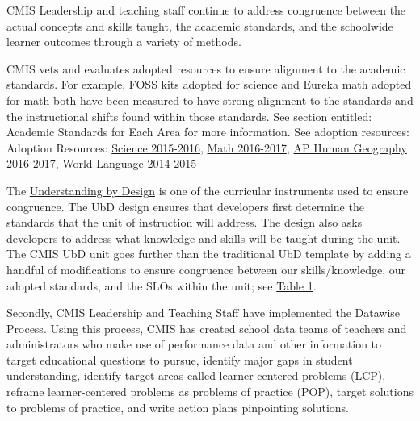\documentclass{report}
\begin{document}

\begin{findings}

CMIS Leadership and teaching staff continue to address congruence between the actual concepts and skills taught, the academic standards, and the schoolwide learner outcomes through a variety of methods. 


CMIS vets and evaluates adopted resources to ensure alignment to the academic standards. For example, FOSS kits adopted for science and Eureka math adopted for math both have been measured to have strong alignment to the standards and the instructional shifts found within those standards. See section entitled: Academic Standards for Each Area for more information. See adoption resources: Adoption Resources: \href{https://drive.google.com/drive/folders/0ByVFfrm0zfoleXEyU3I0cTBXMVk?usp=sharing}{Science 2015-2016}, \href{https://drive.google.com/drive/folders/0ByVFfrm0zfolakRsUVNBaXhWcjQ?usp=sharing}{Math 2016-2017}, \href{https://drive.google.com/drive/folders/0ByVFfrm0zfolLUN5UThPTG5wQlE?usp=sharing}{AP Human Geography 2016-2017}, \href{https://drive.google.com/drive/folders/0ByVFfrm0zfolfkhGeTFZSVRmSFNEZmhlaWZneEE5T0lwWjNQVnlFYVVWVlljU1RBTDZQc1k?usp=sharing}{World Language 2014-2015} 


The \href{https://docs.google.com/a/cmis.ac.th/document/d/1kL1VjwfuMMa7NaWmwUrEah1BM-jJRmLAd4VJzR3HoPs/edit?usp=sharing}{Understanding by Design} is one of the curricular instruments used to ensure congruence. The UbD design ensures that developers first determine the standards that the unit of instruction will address. The design also asks developers to address what knowledge and skills will be taught during the unit. The CMIS UbD unit goes further than the traditional UbD template by adding a handful of modifications to ensure congruence between our skills/knowledge, our adopted standards, and the SLOs within the unit; see \href{https://docs.google.com/a/cmis.ac.th/document/d/1wwb5O3EmHNmzx7MOdHvi0TFjyYRWyELnyD1VRsmuj1Y/edit?usp=sharing}{Table 1}.  


Secondly, CMIS Leadership and Teaching Staff have implemented the Datawise Process. Using this process, CMIS has created school data teams of teachers and administrators who make use of performance data and other information to target educational questions to pursue, identify major gaps in student understanding, identify target areas called learner-centered problems (LCP), reframe learner-centered problems as problems of practice (POP), target solutions to problems of practice, and write action plans pinpointing solutions. 


\end{findings}
\end{document}
